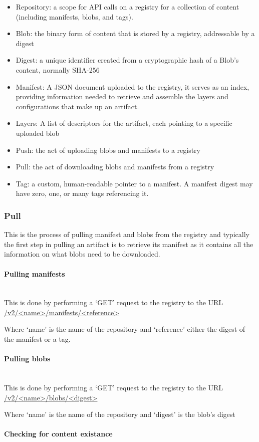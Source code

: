 \documentclass{article}
\newcommand{\subsubsubsection}[1]{\paragraph{#1}\mbox{}\\}
\begin{document}
  \begin{itemize}
    \item Repository: a scope for API calls on a registry for a collection of content (including manifests, blobs, and tags).
    \item Blob: the binary form of content that is stored by a registry, addressable by a digest
    \item Digest: a unique identifier created from a cryptographic hash of a Blob's content, normally SHA-256
    \item Manifest: A JSON document uploaded to the registry, it serves as an index, providing information needed to retrieve and assemble the layers and configurations that make up an artifact.
    \item Layers: A list of descriptors for the artifact, each pointing to a specific uploaded blob
    \item Push: the act of uploading blobs and manifests to a registry
    \item Pull: the act of downloading blobs and manifests from a registry    
    \item Tag: a custom, human-readable pointer to a manifest. A manifest digest may have zero, one, or many tags referencing it.
  \end{itemize}
  
  \subsubsection{Pull}

  This is the process of pulling manifest and blobs from the registry and typically the first step in pulling an artifact is to retrieve its manifest as it contains all the information on what blobs need to be downloaded.

  \subsubsubsection{Pulling manifests}
  
  This is done by performing a `GET' request to the registry to the URL \url{/v2/<name>/manifests/<reference>}

  Where `name' is the name of the repository and `reference' either the digest of the manifest or a tag.

  \subsubsubsection{Pulling blobs}

  This is done by performing a `GET' request to the registry to the URL \url{/v2/<name>/blobs/<digest>}

  Where `name' is the name of the repository and `digest' is the blob's digest

  \subsubsubsection{Checking for content existance}
\end{document}
